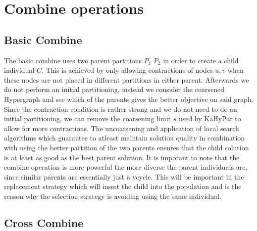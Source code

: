 \documentclass[a4paper,12pt,bibtotoc,titlepage, liststotoc,BCOR7mm,headsepline,pointlessnumbers]{scrbook}
\numberwithin{equation}{section}
\begin{document}
\section{Combine operations}
\subsection{Basic Combine}
The basic combine uses two parent partitions $P_1$ $P_2$ in order to create a child individual $C$. This is achieved by only allowing contractions of nodes $u, v$ when these nodes are not placed in different partitions in either parent. Afterwards we do not perform an initial partitioning, instead we consider the coarsened Hypergraph and see which of the parents gives the better objective on said graph. 
Since the contraction condition is rather strong and we do not need to do an initial partitioning, we can remove the coarsening limit $s$ used by KaHyPar
to allow for more contractions. The uncoarsening and application of local search algorithms which guarantee to atleast maintain solution quality in combination with using the better partition of the two parents ensures that the child solution is at least as good as the best parent solution. It is imporant to note that the combine operation is more powerful the more diverse the parent individuals are, since similar parents are essentially just a vcycle. This will be important in the replacement strategy which will insert the child into the population and is the reason why the selection strategy is avoiding using the same individual. 
\subsection{Cross Combine}
\end{document}
